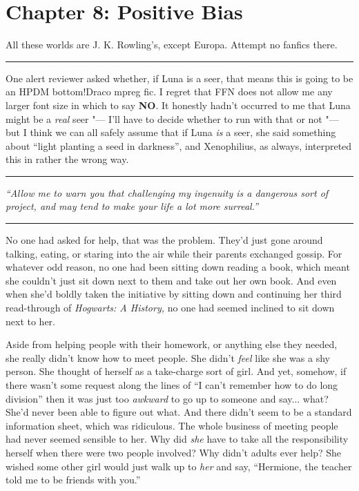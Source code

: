 \chapter{Chapter 8: Positive Bias}
All these worlds are J. K. Rowling's, except Europa. Attempt no fanfics
there.

\begin{center}\rule{3in}{0.4pt}\end{center}

One alert reviewer asked whether, if Luna is a seer, that means this is
going to be an HPDM bottom!Draco mpreg fic. I regret that FFN does not
allow me any larger font size in which to say \textbf{NO}. It honestly
hadn't occurred to me that Luna might be a \emph{real} seer "--- I'll have
to decide whether to run with that or not "--- but I think we can all
safely assume that if Luna \emph{is} a seer, she said something about
``light planting a seed in darkness'', and Xenophilius, as always,
interpreted this in rather the wrong way.

\begin{center}\rule{3in}{0.4pt}\end{center}

\emph{``Allow me to warn you that challenging my ingenuity is a
dangerous sort of project, and may tend to make your life a lot more
surreal.''}

\begin{center}\rule{3in}{0.4pt}\end{center}

No one had asked for help, that was the problem. They'd just gone around
talking, eating, or staring into the air while their parents exchanged
gossip. For whatever odd reason, no one had been sitting down reading a
book, which meant she couldn't just sit down next to them and take out
her own book. And even when she'd boldly taken the initiative by sitting
down and continuing her third read-through of \emph{Hogwarts: A
History,} no one had seemed inclined to sit down next to her.

Aside from helping people with their homework, or anything else they
needed, she really didn't know how to meet people. She didn't
\emph{feel} like she was a shy person. She thought of herself as a
take-charge sort of girl. And yet, somehow, if there wasn't some request
along the lines of ``I can't remember how to do long division'' then it
was just too \emph{awkward} to go up to someone and say... what?
She'd never been able to figure out what. And there didn't seem to be a
standard information sheet, which was ridiculous. The whole business of
meeting people had never seemed sensible to her. Why did \emph{she} have
to take all the responsibility herself when there were two people
involved? Why didn't adults ever help? She wished some other girl would
just walk up to \emph{her} and say, ``Hermione, the teacher told me to
be friends with you.''


